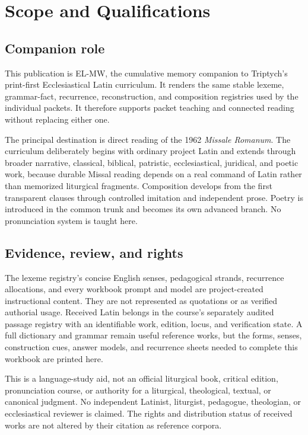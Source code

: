 \chapter{Scope and Qualifications}

\section{Companion role}

This publication is EL-MW, the cumulative memory companion to Triptych's
print-first Ecclesiastical Latin curriculum.  It renders the same stable
lexeme, grammar-fact, recurrence, reconstruction, and composition registries
used by the individual packets.  It therefore supports packet teaching and
connected reading without replacing either one.

The principal destination is direct reading of the 1962 \emph{Missale
Romanum}.  The curriculum deliberately begins with ordinary project Latin and
extends through broader narrative, classical, biblical, patristic,
ecclesiastical, juridical, and poetic work, because durable Missal reading
depends on a real command of Latin rather than memorized liturgical fragments.
Composition develops from the first transparent clauses through controlled
imitation and independent prose.  Poetry is introduced in the common trunk
and becomes its own advanced branch.  No pronunciation system is taught here.

\section{Evidence, review, and rights}

The lexeme registry's concise English senses, pedagogical strands, recurrence
allocations, and every workbook prompt and model are project-created
instructional content.  They are not represented as quotations or as verified
authorial usage.  Received Latin belongs in the course's separately audited
passage registry with an identifiable work, edition, locus, and verification
state.  A full dictionary and grammar remain useful reference works, but the
forms, senses, construction cues, answer models, and recurrence sheets needed
to complete this workbook are printed here.

This is a language-study aid, not an official liturgical book, critical
edition, pronunciation course, or authority for a liturgical, theological,
textual, or canonical judgment.
No independent Latinist, liturgist, pedagogue, theologian, or ecclesiastical
reviewer is claimed.  The rights and distribution status of received works are
not altered by their citation as reference corpora.

